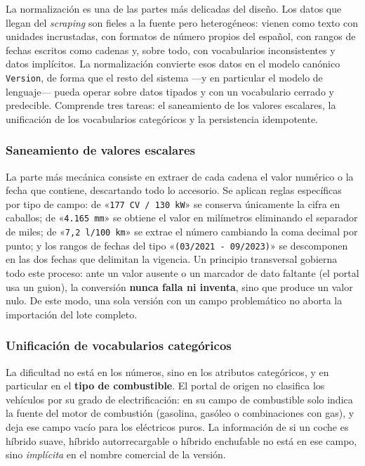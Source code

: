 La normalización es una de las partes más delicadas del diseño. Los datos que
llegan del \emph{scraping} son fieles a la fuente pero heterogéneos: vienen como
texto con unidades incrustadas, con formatos de número propios del español, con
rangos de fechas escritos como cadenas y, sobre todo, con vocabularios
inconsistentes y datos implícitos. La normalización convierte esos datos en el
modelo canónico \texttt{Version}, de forma que el resto del sistema —y en
particular el modelo de lenguaje— pueda operar sobre datos tipados y con un
vocabulario cerrado y predecible. Comprende tres tareas: el saneamiento de los
valores escalares, la unificación de los vocabularios categóricos y la
persistencia idempotente.

\subsubsection*{Saneamiento de valores escalares}

La parte más mecánica consiste en extraer de cada cadena el valor numérico o la
fecha que contiene, descartando todo lo accesorio. Se aplican reglas
específicas por tipo de campo: de «\texttt{177 CV / 130 kW}» se conserva
únicamente la cifra en caballos; de «\texttt{4.165 mm}» se obtiene el valor en
milímetros eliminando el separador de miles; de «\texttt{7,2 l/100 km}» se extrae
el número cambiando la coma decimal por punto; y los rangos de fechas del tipo
«\texttt{(03/2021 - 09/2023)}» se descomponen en las dos fechas que delimitan la
vigencia. Un principio transversal gobierna todo este proceso: ante un valor
ausente o un marcador de dato faltante (el portal usa un guion), la conversión
\textbf{nunca falla ni inventa}, sino que produce un valor nulo. De este modo,
una sola versión con un campo problemático no aborta la importación del lote
completo.

\subsubsection*{Unificación de vocabularios categóricos}

La dificultad no está en los números, sino en los atributos categóricos, y en
particular en el \textbf{tipo de combustible}. El portal de origen no clasifica
los vehículos por su grado de electrificación: en su campo de combustible solo
indica la fuente del motor de combustión (gasolina, gasóleo o combinaciones con
gas), y deja ese campo vacío para los eléctricos puros. La información de si un
coche es híbrido suave, híbrido autorrecargable o híbrido enchufable no está en
ese campo, sino \emph{implícita} en el nombre comercial de la versión.


